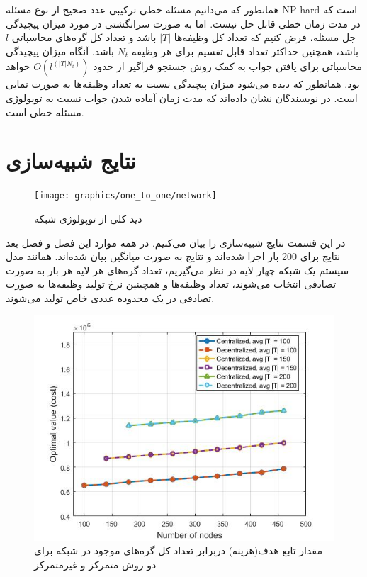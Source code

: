 	همانطور که می‌دانیم مسئله خطی ترکیبی عدد صحیح از نوع مسئله NP-hard است که در مدت زمان خطی قابل حل نیست. اما به صورت سرانگشتی در مورد میزان پیچیدگی جل مسئله، فرض کنیم که تعداد کل وظیفه‌ها $|T|$ باشد و تعداد کل گره‌های محاسباتی $l$ باشد، همچنین حداکثر تعداد قابل تقسیم برای هر وظیفه $N_t$ باشد. آنگاه میزان پیچیدگی محاسباتی برای یافتن جواب به کمک روش جستجو فراگیر از حدود $O(l^{(|T|N_t)})$ خواهد بود. همانطور که دیده می‌شود میزان پیچیدگی نسبت به تعداد وظیفه‌ها به صورت نمایی است. در \cite{vujanic2016decomposition} نویسندگان نشان داده‌اند که مدت زمان آماده شدن جواب نسبت به توپولوژی مسئله خطی است. 
	
\section{نتایج شبیه‌سازی}

\begin{figure}[h!]
	\centerline{\texttt{[image: graphics/one\_to\_one/network]}}
	\caption{دید کلی از توپولوژی شبکه}
	\label{fig:network}
\end{figure}

	در این قسمت نتایج شبیه‌سازی را بیان می‌کنیم. در همه موارد این فصل و فصل بعد نتایج برای 200 بار اجرا شده‌اند و نتایج به صورت میانگین بیان شده‌اند. همانند مدل سیستم یک شبکه چهار لایه در نظر می‌گیریم، تعداد گره‌های هر لایه هر بار به صورت تصادفی انتخاب می‌شوند، تعداد وظیفه‌ها و همچینین نرخ تولید وظیفه‌ها به صورت تصادفی در یک محدوده عددی خاص تولید می‌شوند. 
\begin{figure}[h!]
	\centerline{\includegraphics[width=12cm]{graphics/3-cent-decent/optimization_value_per_number_of_nodes}}
	\caption{مقدار تابع هدف(هزینه) دربرابر تعداد کل گره‌های موجود در شبکه برای دو روش متمرکز و غیرمتمرکز}
	\label{fig:optimization_value_per_number_of_nodes}
\end{figure}

